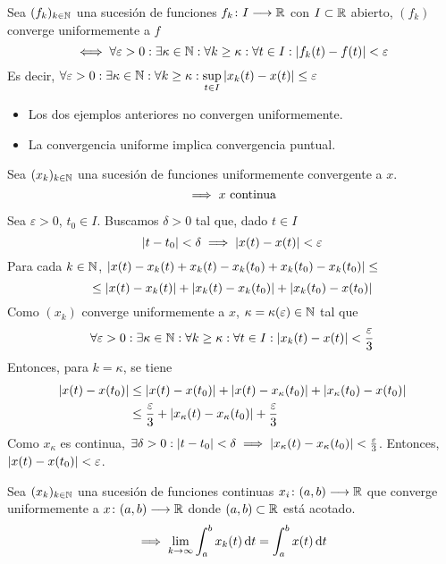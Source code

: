 \begin{defn}
	Sea $(f_k)_{k\in\mathbb{N}}$ una sucesión de funciones $f_k \colon I \longrightarrow \mathbb{R}$ con $I\subset \mathbb{R}$ abierto, $(f_k)$ converge uniformemente a $f$
	\[\iff \forall \varepsilon > 0 : \exists \kappa \in \mathbb{N} : \forall k\geq \kappa : \forall t\in I : \left|f_k(t) - f(t)\right| < \varepsilon\]
	Es decir, $\displaystyle \forall \varepsilon > 0 : \exists \kappa \in \mathbb{N} : \forall k \geq \kappa : \sup_{t\in I} \left|x_k(t)-x(t)\right| \leq \varepsilon$
\end{defn}
\begin{obs}\begin{itemize}
		\item Los dos ejemplos anteriores no convergen uniformemente.
		\item La convergencia uniforme implica convergencia puntual.
	\end{itemize}\end{obs}
\begin{prop}
	Sea $(x_k)_{k\in\mathbb{N}}$ una sucesión de funciones uniformemente convergente a $x$.
	\[\implies x \text{ continua}\]
	\begin{dem}
		Sea $\varepsilon > 0$, $t_0 \in I$. Buscamos $\delta > 0$ tal que, dado $t\in I$
		\[\left|t-t_0\right| < \delta \implies \left|x(t)-x(t)\right|< \varepsilon\]
		Para cada $k\in\mathbb{N}$, $\left|x(t)-x_k(t)+x_k(t)-x_k(t_0)+x_k(t_0)-x_k(t_0)\right| \leq$
		\[\leq \left|x(t)-x_k(t)\right| + \left|x_k(t)-x_k(t_0)\right|  + \left|x_k(t_0)-x(t_0)\right|\]
		Como $(x_k)$ converge uniformemente a $x$, $\kappa = \kappa(\varepsilon) \in \mathbb{N}$ tal que
		\[\forall \varepsilon > 0 : \exists \kappa \in \mathbb{N} : \forall k\geq \kappa : \forall t\in I : \left|x_k(t) - x(t)\right| < \frac{\varepsilon}{3}\]
		Entonces, para $k=\kappa$, se tiene
		\[\begin{aligned}
			\left|x(t)-x(t_0)\right| &\leq \left|x(t)-x(t_0)\right|+\left|x(t)-x_\kappa(t_0)\right| + \left|x_\kappa(t_0)-x(t_0)\right| \\
			&\leq \frac{\varepsilon}{3} + \left|x_\kappa(t)-x_\kappa(t_0)\right| + \frac{\varepsilon}{3} 
		\end{aligned}\]
		Como $x_\kappa$ es continua, $\exists \delta > 0 : \left|t-t_0\right| < \delta \implies \left|x_\kappa(t)-x_\kappa(t_0)\right| < \frac{\varepsilon}{3}$. Entonces, $\left|x(t)-x(t_0)\right| < \varepsilon$.
	\end{dem}
\end{prop}
\begin{prop}
	Sea $(x_k)_{k\in\mathbb{N}}$ una sucesión de funciones continuas $x_i \colon (a,b) \longrightarrow \mathbb{R}$ que converge uniformemente a $x \colon (a,b) \longrightarrow \mathbb{R}$ donde $(a,b) \subset \mathbb{R}$ está acotado.
	\[\implies \lim_{k\to\infty} \int_{a}^{b} x_k(t) \odif{t} = \int_{a}^{b} x(t) \odif{t}\]
\end{prop}

